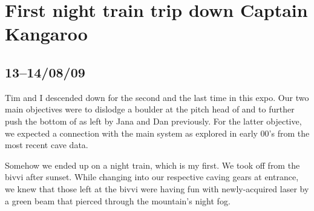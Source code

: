 \section{First night train trip down Captain Kangaroo}

\subsection{13--14/08/09}


Tim and I descended down  for the second and the
last time in this expo. Our two main objectives were to dislodge a
boulder at the pitch head of  and to further push the
bottom of  as left by Jana and Dan previously. For
the latter objective, we expected a connection with the main  system
as explored in early 00's from the most recent cave data.

Somehow we ended up on a night train, which is my first. We took off
from the bivvi after sunset. While changing into our respective caving
gears at  entrance, we knew that those left at the bivvi were having
fun with newly-acquired laser by a green beam that pierced through
the mountain's night fog.


